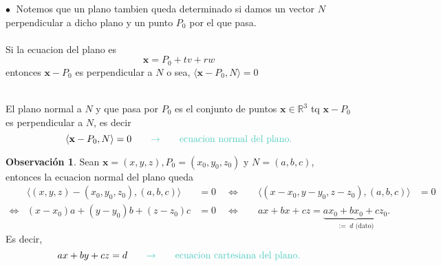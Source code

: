 \documentclass{article}
\theoremstyle{definition}
\newtheorem*{obs}{Observación}
\theoremstyle{remark}
\newcommand\bl{$\bullet\;$}
\begin{document}
\begin{figure}[h]
\centering
\def\svgwidth{0.75\textwidth}

\end{figure}
\;
\pagebreak \textcolor{rojop2}{\bl} Notemos que un plano tambien queda determinado si damos un vector $N$ perpendicular a dicho plano y un punto $P_0$ por el que pasa. \\\\ Si la ecuacion del plano es \[
  \mathbf{x}=P_0+tv+rw
\] entonces $\mathbf{x}-P_0$ es perpendicular a $N$ o sea, $\langle \mathbf{x}-P_0 , N \rangle = 0$

\begin{figure}[h]
\centering
\def\svgwidth{0.75\textwidth}

\end{figure} 
\begin{defi}
  \; \\
  El plano normal a $N$ y que pasa por $P_0$ es el conjunto de puntos $\mathbf{x} \in \mathbb{R}^3$ tq $\mathbf{x}-P_0$ es perpendicular a $N$, es decir \[
    \langle \mathbf{x} - P_0, N\rangle = 0  \quad \quad \textcolor{verdep2}{\to} \quad \quad \text{\textcolor{verdep2}{ecuacion normal del plano.}}
  \]
\end{defi}
\begin{obs}
  Sean $\mathbf{x}=(x,y,z), P_0=(x_0,y_0,z_0)$ y $N=(a,b,c)$, entonces la ecuacion normal del plano queda \[
    \begin{array}{lllll}
  & \langle (x,y,z) - (x_0,y_0,z_0), (a,b,c) \rangle  & = 0 \quad \Leftrightarrow \quad & \langle (x-x_0,y-y_0,z-z_0), (a,b,c) \rangle &  = 0  \\
      \Leftrightarrow & (x-x_0)a+(y-y_0)b+(z-z_0)c & = 0  \quad \Leftrightarrow \quad & ax+bx+cz=\underbrace{ax_0+bx_0+cz_0}_{:= \;  d \text{ (dato)}} .
\end{array}\]
Es decir, \[ 
  ax+by+cz = d \quad \quad \textcolor{verdep2}{\to} \quad \quad \text{\textcolor{verdep2}{ecuacion cartesiana del plano.}}
\]
\end{obs}
\end{document}
